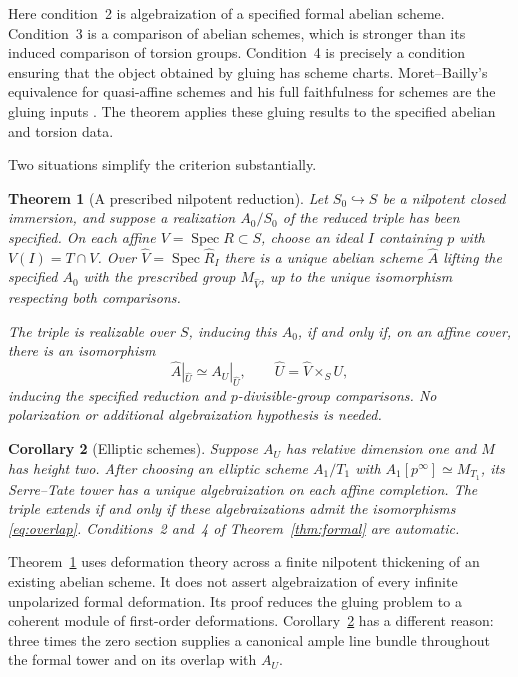 \documentclass[11pt]{article}
\newtheorem{theorem}{Theorem}[section]
\newtheorem{corollary}[theorem]{Corollary}
\theoremstyle{definition}\newtheorem{definition}[theorem]{Definition}
\theoremstyle{remark}\newtheorem{remark}[theorem]{Remark}
\newcommand{\Spec}{\operatorname{Spec}}
\begin{document}
Here condition~2 is algebraization of a specified formal abelian scheme. Condition~3 is a comparison of abelian schemes, which is stronger than its induced comparison of torsion groups. Condition~4 is precisely a condition ensuring that the object obtained by gluing has scheme charts. Moret--Bailly's equivalence for quasi-affine schemes and his full faithfulness for schemes are the gluing inputs \citep[Theorems~1.1--1.2, p.~565]{MoretBailly}. The theorem applies these gluing results to the specified abelian and torsion data.

Two situations simplify the criterion substantially.

\begin{theorem}[A prescribed nilpotent reduction]\label{thm:nilpotent}
Let $S_0\hookrightarrow S$ be a nilpotent closed immersion, and suppose a realization $A_0/S_0$ of the reduced triple has been specified. On each affine $V=\Spec R\subset S$, choose an ideal $I$ containing $p$ with $V(I)=T\cap V$. Over $\widehat V=\Spec\widehat R_I$ there is a unique abelian scheme $\widehat A$ lifting the specified $A_0$ with the prescribed group $M_{\widehat V}$, up to the unique isomorphism respecting both comparisons.

The triple is realizable over $S$, inducing this $A_0$, if and only if, on an affine cover, there is an isomorphism
\[
 \widehat A|_{\widehat U}\simeq A_U|_{\widehat U},\qquad
 \widehat U=\widehat V\times_S U,
\]
inducing the specified reduction and $p$-divisible-group comparisons. No polarization or additional algebraization hypothesis is needed.
\end{theorem}

\begin{corollary}[Elliptic schemes]\label{cor:elliptic}
Suppose $A_U$ has relative dimension one and $M$ has height two. After choosing an elliptic scheme $A_1/T_1$ with $A_1[p^\infty]\simeq M_{T_1}$, its Serre--Tate tower has a unique algebraization on each affine completion. The triple extends if and only if these algebraizations admit the isomorphisms \eqref{eq:overlap}. Conditions~2 and~4 of Theorem~\ref{thm:formal} are automatic.
\end{corollary}

Theorem~\ref{thm:nilpotent} uses deformation theory across a finite nilpotent thickening of an existing abelian scheme. It does not assert algebraization of every infinite unpolarized formal deformation. Its proof reduces the gluing problem to a coherent module of first-order deformations. Corollary~\ref{cor:elliptic} has a different reason: three times the zero section supplies a canonical ample line bundle throughout the formal tower and on its overlap with $A_U$.
\end{document}
